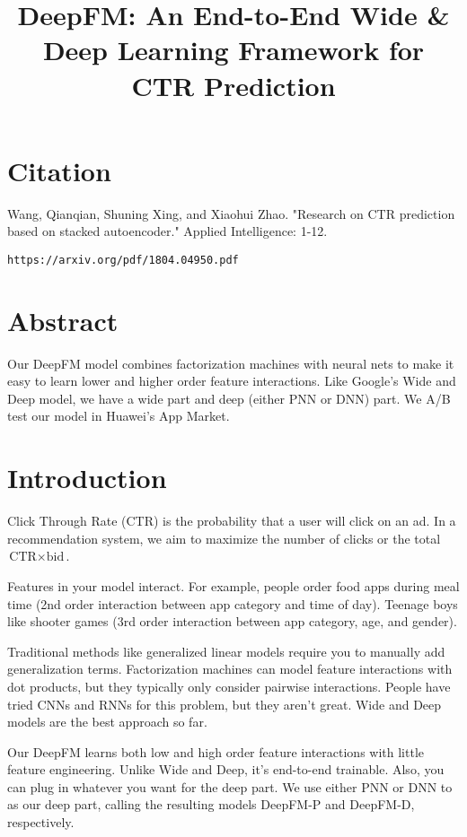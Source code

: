 \documentclass[a4paper]{article}
\title{DeepFM: An End-to-End Wide & Deep Learning Framework for CTR Prediction}
\date{}
\begin{document}
\maketitle

\section{Citation}
Wang, Qianqian, Shuning Xing, and Xiaohui Zhao. "Research on CTR prediction based on stacked autoencoder." Applied Intelligence: 1-12.

\begin{verbatim}
https://arxiv.org/pdf/1804.04950.pdf
\end{verbatim}

\section{Abstract}
Our DeepFM model combines factorization machines with neural nets to make it easy
to learn lower and higher order feature interactions. Like Google's Wide and Deep
model, we have a wide part and deep (either PNN or DNN) part. We A/B test our
model in Huawei's App Market.

\section{Introduction}
Click Through Rate (CTR) is the probability that a user will click on an ad. In
a recommendation system, we aim to maximize the number of clicks or the total
$\textrm{CTR} \times \textrm{bid}$.

Features in your model interact. For example, people order food apps during meal
time (2nd order interaction between app category and time of day). Teenage boys
like shooter games (3rd order interaction between app category, age, and
gender).

Traditional methods like generalized linear models require you to manually add
generalization terms. Factorization machines can model feature interactions with
dot products, but they typically only consider pairwise interactions. People
have tried CNNs and RNNs for this problem, but they aren't great. Wide and Deep
models are the best approach so far.

Our DeepFM learns both low and high order feature interactions with little
feature engineering. Unlike Wide and Deep, it's end-to-end trainable. Also,
you can plug in whatever you want for the deep part. We use either PNN or
DNN to as our deep part, calling the resulting models DeepFM-P and DeepFM-D,
respectively.
\end{document}
